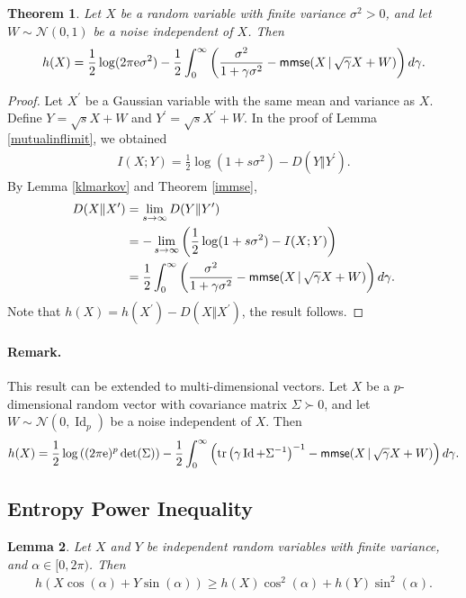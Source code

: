\documentclass{article}
\numberwithin{equation}{section}
\newcommand{\e}{\mathrm{e}}
\renewcommand{\cal}{\mathcal}
\DeclareMathOperator{\id}{Id}
\DeclareMathOperator{\tr}{tr}
\theoremstyle{plain}
\newtheorem{theorem}{Theorem}[section]
\newtheorem{lemma}[theorem]{Lemma}
\theoremstyle{definition}
\begin{document}
\begin{theorem}\label{diffentrmmse}
Let $X$ be a random variable with finite variance $\sigma^2>0$, and let $W\sim\cal{N}(0,1)$ be a noise independent of $X$. Then
\begin{align*}
	h(X)=\frac{1}{2}\log(2\pi\e\sigma^2)-\frac{1}{2}\int_0^\infty\left(\frac{\sigma^2}{1+\gamma\sigma^2}-{\sf mmse}(X\,|\,\sqrt{\gamma}X+W)\right)d\gamma.
\end{align*}
\end{theorem}
\begin{proof}
Let $X^\prime$ be a Gaussian variable with the same mean and variance as $X$. Define $Y=\sqrt{s}X+W$ and $Y^\prime=\sqrt{s}X^\prime+W$. In the proof of Lemma \ref{mutualinflimit}, we obtained
\begin{align*}
	I(X;Y)=\frac{1}{2}\log(1+s\sigma^2)-D(Y\Vert Y^\prime).
\end{align*}
By Lemma \ref{klmarkov} and Theorem \ref{immse},
\begin{align*}
	D(X\Vert X^\prime)&=\lim_{s\to\infty}D(Y\Vert Y^\prime)\\
	&=-\lim_{s\to\infty}\left(\frac{1}{2}\log(1+s\sigma^2)-I(X;Y)\right)\\
	&=\frac{1}{2}\int_0^\infty\left(\frac{\sigma^2}{1+\gamma\sigma^2}-{\sf mmse}(X\,|\,\sqrt{\gamma}X+W)\right)d\gamma.
\end{align*}
Note that $h(X)=h(X^\prime)-D(X\Vert X^\prime)$, the result follows.
\end{proof}

\paragraph{Remark.} This result can be extended to multi-dimensional vectors. Let $X$ be a $p$-dimensional random vector with covariance matrix $\Sigma\succ 0$, and let $W\sim\cal{N}(0,\id_p)$ be a noise independent of $X$. Then
\begin{align*}
	h(X)=\frac{1}{2}\log\left((2\pi\e)^p\det(\Sigma)\right)-\frac{1}{2}\int_0^\infty\left(\tr\left(\gamma\id +\Sigma^{-1}\right)^{-1}-{\sf mmse}(X\,|\,\sqrt{\gamma}X+W)\right)d\gamma.
\end{align*}

\subsection{Entropy Power Inequality}
\begin{lemma}\label{entpowerlemma}
Let $X$ and $Y$ be independent random variables with finite variance, and $\alpha\in[0,2\pi)$. Then
\begin{align*}
	h(X\cos(\alpha)+Y\sin(\alpha))\geq h(X)\cos^2(\alpha)+h(Y)\sin^2(\alpha).
\end{align*}
\end{lemma}
\end{document}
